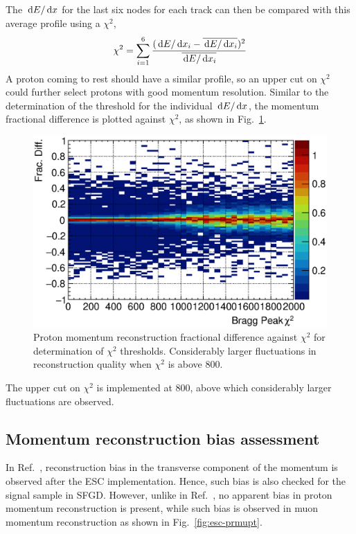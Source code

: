      The $\,\textrm{d}E/\,\textrm{d}x$ for the last six nodes for each track can then be compared with this average profile using a $\chi^2$,
    \begin{equation}
    \chi^2 = \sum_{i=1}^{6} \frac{(\,\textrm{d}E/\,\textrm{d}x_i - \overline{\,\textrm{d}E/\,\textrm{d}x_i})^2}{\overline{\,\textrm{d}E/\,\textrm{d}x_i}}
    \end{equation}
    A proton coming to rest should have a similar profile, so an upper cut on $\chi^2$ could further select protons with good momentum resolution. 
    Similar to the determination of the threshold for the individual $\,\textrm{d}E/\,\textrm{d}x$, the momentum fractional difference is plotted against $\chi^2$, as shown in Fig.~\ref{fig:esc-mom-res-chi2}.
    \begin{figure}[ht]
       \centering
       \includegraphics[width=\sgfidwid\textwidth]{figures/sel/fig55.eps} 
       \caption{Proton momentum reconstruction fractional difference against $\chi^2$ for determination of $\chi^2$ thresholds. Considerably larger fluctuations in reconstruction quality when $\chi^2$ is above $800$.}
       \label{fig:esc-mom-res-chi2}
    \end{figure}
    The upper cut on $\chi^2$ is implemented at $800$, above which considerably larger fluctuations are observed.

    \subsection{Momentum reconstruction bias assessment}
    \label{sec:sel-esc-bias}
     In Ref.~\cite{Lu:2016mjf}, reconstruction bias in the transverse component of the momentum is observed after the ESC implementation.
     Hence, such bias is also checked for the signal sample in SFGD.
     However, unlike in Ref.~\cite{Lu:2016mjf}, no apparent bias in proton momentum reconstruction is present, while such bias is observed in muon momentum reconstruction as shown in Fig.~\ref{fig:esc-prmupt}.

